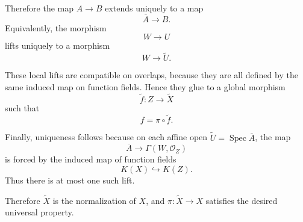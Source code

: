 Therefore the map \(A\to B\) extends uniquely to a map
\[
\overline{A}\longrightarrow B.
\]
Equivalently, the morphism
\[
W\longrightarrow U
\]
lifts uniquely to a morphism
\[
W\longrightarrow \widetilde{U}.
\]

These local lifts are compatible on overlaps, because they are all
defined by the same induced map on function fields. Hence they glue to a
global morphism
\[
\widetilde{f}:Z\longrightarrow \widetilde{X}
\]
such that
\[
f=\pi\circ \widetilde{f}.
\]

Finally, uniqueness follows because on each affine open
\(\widetilde{U}=\operatorname{Spec}\overline{A}\), the map
\[
\overline{A}\longrightarrow \Gamma(W,\mathcal{O}_Z)
\]
is forced by the induced map of function fields
\[
K(X)\hookrightarrow K(Z).
\]
Thus there is at most one such lift.

Therefore \(\widetilde{X}\) is the normalization of \(X\), and
\(\pi:\widetilde{X}\to X\) satisfies the desired universal property.
